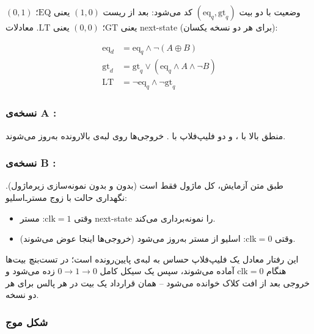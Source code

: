 \documentclass[10pt,a4paper]{article}
\begin{document}
وضعیت با دو بیت $(\mathrm{eq}_q, \mathrm{gt}_q)$ کد می‌شود: بعد از ریست $(1,0)$ یعنی $\mathrm{EQ}$؛ $(0,1)$ یعنی $\mathrm{GT}$؛ $(0,0)$ یعنی $\mathrm{LT}$. معادلات next-state (برای هر دو نسخه یکسان):

\[
\begin{aligned}
\mathrm{eq}_d &= \mathrm{eq}_q \land \lnot(A \oplus B)\\
\mathrm{gt}_d &= \mathrm{gt}_q \lor (\mathrm{eq}_q \land A \land \lnot B)\\
\mathrm{LT} &= \lnot \mathrm{eq}_q \land \lnot \mathrm{gt}_q
\end{aligned}
\]

\subsubsection*{نسخه‌ی A : }
منطق بالا با ، و دو فلیپ‌فلاپ با . خروجی‌ها روی لبه‌ی بالارونده به‌روز می‌شوند.

\begin{latin}

\end{latin}

\subsubsection*{نسخه‌ی B : }
طبق متن آزمایش، کل ماژول فقط  است (بدون  و بدون نمونه‌سازی زیرماژول). نگهداری حالت با زوج  مسترـ‌اسلیو:

\begin{itemize}
  \item وقتی $\mathrm{clk}=1$: مستر next-state را نمونه‌برداری می‌کند.
  \item وقتی $\mathrm{clk}=0$: اسلیو از مستر به‌روز می‌شود (خروجی‌ها اینجا عوض می‌شوند).
\end{itemize}

این رفتار معادل یک فلیپ‌فلاپ حساس به لبه‌ی پایین‌رونده است؛ در تست‌بنچ بیت‌ها هنگام $\mathrm{clk}=0$ آماده می‌شوند، سپس یک سیکل کامل $0\to1\to0$ زده می‌شود و خروجی بعد از افت کلاک خوانده می‌شود -- همان قرارداد یک بیت در هر پالس برای هر دو نسخه.

\begin{latin}

\end{latin}

\subsubsection*{شکل موج}
\end{document}
